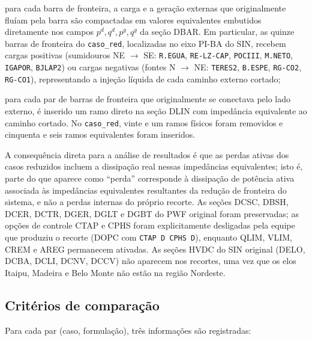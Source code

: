 \begin{alineascomnumero}
    \item para cada barra de fronteira, a carga e a geração externas que originalmente fluíam pela barra são compactadas em valores equivalentes embutidos diretamente nos campos $p^d, q^d, p^g, q^g$ da seção DBAR. Em particular, as quinze barras de fronteira do \texttt{caso\_red}, localizadas no eixo PI-BA do SIN, recebem cargas positivas (sumidouros NE $\rightarrow$ SE: \texttt{R.EGUA}, \texttt{RE-LZ-CAP}, \texttt{POCIII}, \texttt{M.NETO}, \texttt{IGAPOR}, \texttt{BJLAP2}) ou cargas negativas (fontes N $\rightarrow$ NE: \texttt{TERES2}, \texttt{B.ESPE}, \texttt{RG-CO2}, \texttt{RG-CO1}), representando a injeção líquida de cada caminho externo cortado;
    \item para cada par de barras de fronteira que originalmente se conectava pelo lado externo, é inserido um ramo direto na seção DLIN com impedância equivalente ao caminho cortado. No \texttt{caso\_red}, vinte e um ramos físicos foram removidos e cinquenta e seis ramos equivalentes foram inseridos.
\end{alineascomnumero}

A consequência direta para a análise de resultados é que as perdas ativas dos casos reduzidos incluem a dissipação real nessas impedâncias equivalentes; isto é, parte do que aparece como ``perda'' corresponde à dissipação de potência ativa associada às impedâncias equivalentes resultantes da redução de fronteira do sistema, e não a perdas internas do próprio recorte. As seções DCSC, DBSH, DCER, DCTR, DGER, DGLT e DGBT do PWF original foram preservadas; as opções de controle CTAP e CPHS foram explicitamente desligadas pela equipe que produziu o recorte (DOPC com \texttt{CTAP D CPHS D}), enquanto QLIM, VLIM, CREM e AREG permanecem ativadas. As seções HVDC do SIN original (DELO, DCBA, DCLI, DCNV, DCCV) não aparecem nos recortes, uma vez que os elos Itaipu, Madeira e Belo Monte não estão na região Nordeste.

\subsection{Critérios de comparação}
\label{subsec:criterios}

Para cada par (caso, formulação), três informações são registradas:

